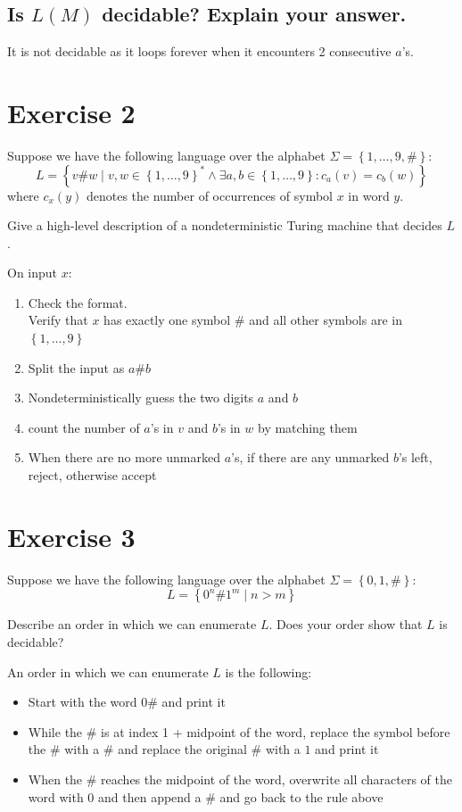 \documentclass[a4paper,11pt]{article}
\newcommand{\Alphabet}{\Sigma}
\newcommand{\set}[1]{\left\{ #1 \right\}}
\begin{document}
	\subsection{Is $L(M)$ decidable? Explain your answer.}
	It is not decidable as it loops forever when it encounters 2 consecutive $a$'s.

	\section{Exercise 2}
	Suppose we have the following language over the alphabet $\Alphabet = \set{1,\dots,9,\#}$:
	\[
	L = \set{v\#w \mid v,w \in \set{1,\dots,9}^* \land \exists a,b \in \set{1,\dots,9} : c_a(v) = c_b(w)}
	\]
	where $c_x(y)$ denotes the number of occurrences of symbol $x$ in word $y$.

	Give a high-level description of a nondeterministic Turing machine that decides $L$.

	On input $x$:
	\begin{enumerate}
		\item Check the format.\\
		Verify that $x$ has exactly one symbol $\#$ and all other symbols are in $\set{1,\dots,9}$
		\item Split the input as $a\#b$
		\item Nondeterministically guess the two digits $a$ and $b$
		\item count the number of $a$'s in $v$ and $b$'s in $w$ by matching them
		\item When there are no more unmarked $a$'s, if there are any unmarked $b$'s left, reject, otherwise accept
	\end{enumerate}


	\section{Exercise 3}
	Suppose we have the following language over the alphabet $\Alphabet = \set{0,1,\#}$:
	\[
	L = \set{0^n\#1^m \mid n > m}
	\]

	Describe an order in which we can enumerate $L$. Does your order show that $L$ is decidable?

	An order in which we can enumerate $L$ is the following:
	\begin{itemize}
		\item Start with the word $0\#$ and print it
		\item While the $\#$ is at index 1 + midpoint of the word, replace the symbol before the $\#$ with a $\#$ and replace the original $\#$ with a $1$ and print it
		\item When the $\#$ reaches the midpoint of the word, overwrite all characters of the word with $0$ and then append a $\#$ and go back to the rule above
	\end{itemize}
\end{document}
